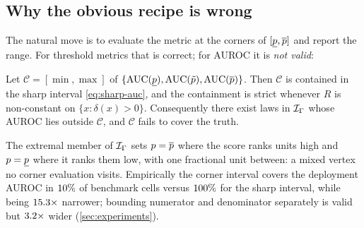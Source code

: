 \subsection{Why the obvious recipe is wrong}

The natural move is to evaluate the metric at the corners of $[\underline{p},\overline{p}]$ and
report the range. For threshold metrics that is correct; for AUROC it is
\emph{not valid}:

\begin{proposition}
\label{prop:corner}
Let $\mathcal{C} = [\min,\max]$ of $\{\operatorname{AUC}(\underline{p}),\operatorname{AUC}(\tilde p),\operatorname{AUC}(\overline{p})\}$.
Then $\mathcal{C}$ is contained in the sharp interval \eqref{eq:sharp-auc}, and
the containment is strict whenever $R$ is non-constant on
$\{x:\delta(x)>0\}$. Consequently there exist laws in $\mathcal{I}_\Gamma$ whose AUROC
lies outside $\mathcal{C}$, and $\mathcal{C}$ fails to cover the truth.
\end{proposition}

The extremal member of $\mathcal{I}_\Gamma$ sets $p=\overline{p}$ where the score ranks units
high and $p=\underline{p}$ where it ranks them low, with one fractional unit between: a
mixed vertex no corner evaluation visits. Empirically the corner interval
covers the deployment AUROC in $10\%$ of benchmark cells versus
$100\%$ for the sharp interval, while being
$15.3\times$ narrower; bounding numerator and denominator
separately is valid but $3.2\times$ wider
(\cref{sec:experiments}).
